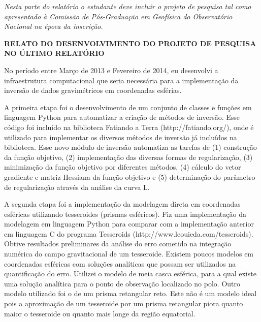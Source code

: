 \documentclass[12pt,a4paper]{article}
\begin{document}
\vspace{1cm}

\textit{
Nesta parte do relatório o estudante deve incluir o projeto de pesquisa tal
como apresentado à Comissão de Pós-Graduação em Geofísica do Observatório
Nacional na época da inscrição.
}

\newpage

\begin{center}
\textbf{\large RELATO DO DESENVOLVIMENTO DO PROJETO DE PESQUISA NO ÚLTIMO
RELATÓRIO}
\end{center}

\vspace{1cm}

No período entre Março de 2013 e Fevereiro de 2014,
eu desenvolvi a infraestrutura computacional que seria necessária para a
implementação da inversão de dados gravimétricos em coordenadas esférias.

A primeira etapa foi o desenvolvimento de um conjunto
de classes e funções em linguagem Python para
automatizar a criação de métodos de inversão.
Esse código foi incluído na biblioteca Fatiando a Terra (http://fatiando.org/),
onde é utilizado para implementar os diversos métodos de inversão já incluídos
na biblioteca.
Esse novo módulo de inversão automatiza as tarefas de
(1) construção da função objetivo,
(2) implementação das diversas formas de regularização,
(3) minimização da função objetivo por diferentes métodos,
(4) cálculo do vetor gradiente e matriz Hessiana da função objetivo
e (5) determinação do parâmetro de regularização através da análise da curva L.

A segunda etapa foi a implementação da modelagem direta em coordenadas
esféricas utilizando tesseroides (prismas esféricos).
Fiz uma implementação da modelagem em linguagem Python para comparar com a
implementação anterior em linguagem C do programa Tesseroids
(http://www.leouieda.com/tesseroids).
Obtive resultados preliminares da análise do erro cometido na integração
numérica do campo gravitacional de um tesseroide.
Existem poucos modelos em coordenadas esféricas com soluções analíticas que
possam ser utilizados na quantificação do erro.
Utilizei o modelo de meia casca esférica, para a qual existe uma solução
analítica para o ponto de observação localizado no polo.
Outro modelo utilizado foi o de um prisma retangular reto.
Este não é um modelo ideal pois a aproximação de um tesseroide por um prisma
retangular piora quanto maior o tesseroide ou quanto mais longe da região
equatorial.
\end{document}
